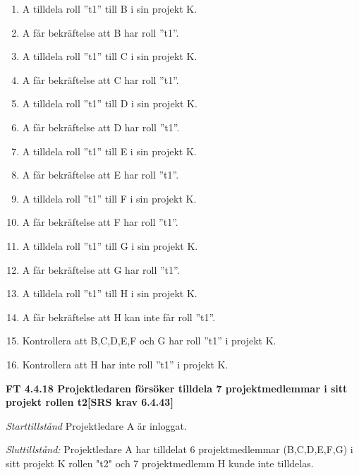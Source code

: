 \documentclass[a4paper]{article}
\begin{document}
\begin{enumerate}
\item A tilldela roll ”t1” till B i sin projekt K. 
\item  A får bekräftelse att B har roll ”t1”.
\item A tilldela roll ”t1” till C i sin projekt K. 
\item A får bekräftelse att C har roll ”t1”.
\item A tilldela roll ”t1” till D i sin projekt K. 
\item A får bekräftelse att D har roll ”t1”.
\item A tilldela roll ”t1” till E i sin projekt K. 
\item A får bekräftelse att E har roll ”t1”.
\item A tilldela roll ”t1” till F i sin projekt K.
\item A får bekräftelse att F har roll ”t1”.
\item A tilldela roll ”t1” till G i sin projekt K. 
\item A får bekräftelse att G har roll ”t1”.
\item A tilldela roll ”t1” till H i sin projekt K. 
\item A får bekräftelse att  H kan inte får roll ”t1”.
\item Kontrollera att B,C,D,E,F och G har roll ”t1” i projekt K.
\item Kontrollera att H har inte roll ”t1” i projekt K.
\end{enumerate}

\textbf{FT 4.4.18 Projektledaren försöker tilldela 7 projektmedlemmar i sitt projekt rollen t2[SRS krav 6.4.43]}

\emph{Starttillstånd} Projektledare A är inloggat.

\emph{Sluttillstånd:} Projektledare A  har tilldelat 6 projektmedlemmar (B,C,D,E,F,G) i sitt projekt K  rollen "t2" och 7 projektmedlemm H kunde inte tilldelas.
\end{document}
